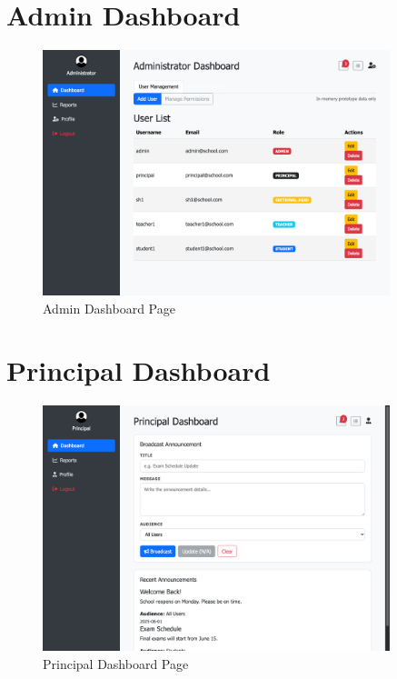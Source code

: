 \documentclass[12pt,a4paper]{report}
\begin{document}
\section{Admin Dashboard}
\begin{figure}[htbp]
    \centering
    \includegraphics[width=0.9\textwidth]{admin-dashboard-page.png}
    \caption{Admin Dashboard Page}
    \label{fig:admin-dashboard-page}
\end{figure}

\section{Principal Dashboard}
\begin{figure}[htbp]
    \centering
    \includegraphics[width=0.9\textwidth]{principal-dashboard-page.png}
    \caption{Principal Dashboard Page}
    \label{fig:principal-dashboard-page}
\end{figure}
\end{document}
